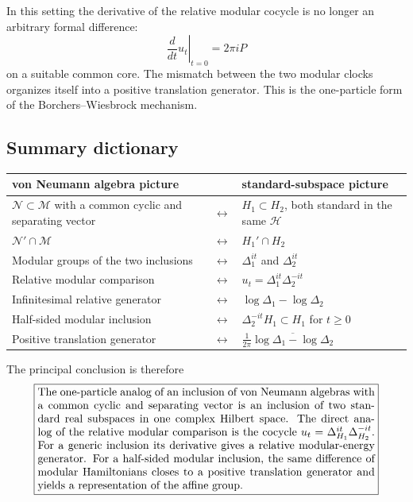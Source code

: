 \documentclass[a4paper,11pt]{article}
\theoremstyle{definition}
\newcommand{\cH}{\mathcal{H}}
\begin{document}
In this setting the derivative of the relative modular cocycle is no
longer an arbitrary formal difference:
\[
\left.\frac{d}{dt}u_t\right|_{t=0}
   =2\pi iP
\]
on a suitable common core.  The mismatch between the two modular clocks
organizes itself into a positive translation generator.  This is the
one-particle form of the Borchers--Wiesbrock mechanism.

\subsection*{Summary dictionary}

\renewcommand{\arraystretch}{1.45}
\setlength{\tabcolsep}{4pt}
\begin{center}
\begin{tabular}{>{\raggedright\arraybackslash}p{}
                >{\centering\arraybackslash}p{}
                >{\raggedright\arraybackslash}p{}}
\toprule
\textbf{von Neumann algebra picture}
& &
\textbf{standard-subspace picture}\\
\midrule
$\mathcal{N}\subset\mathcal{M}$ with a common cyclic and separating vector
& $\longleftrightarrow$ &
$H_1\subset H_2$, both standard in the same $\cH$\\
$\mathcal{N}'\cap\mathcal{M}$
& $\longleftrightarrow$ &
$H_1'\cap H_2$\\
Modular groups of the two inclusions
& $\longleftrightarrow$ &
$\Delta_1^{it}$ and $\Delta_2^{it}$\\
Relative modular comparison
& $\longleftrightarrow$ &
$u_t=\Delta_1^{it}\Delta_2^{-it}$\\
Infinitesimal relative generator
& $\longleftrightarrow$ &
$\log\Delta_1-\log\Delta_2$\\
Half-sided modular inclusion
& $\longleftrightarrow$ &
$\Delta_2^{-it}H_1\subset H_1$ for $t\geq0$\\
Positive translation generator
& $\longleftrightarrow$ &
$\frac{1}{2\pi}\overline{\log\Delta_1-\log\Delta_2}$\\
\bottomrule
\end{tabular}
\end{center}

The principal conclusion is therefore
\[
\boxed{
\begin{minipage}{0.88\textwidth}
The one-particle analog of an inclusion of von Neumann algebras with a
common cyclic and separating vector is an inclusion of two standard real
subspaces in one complex Hilbert space.  The direct analog of the relative
modular comparison is the cocycle
$u_t=\Delta_{H_1}^{it}\Delta_{H_2}^{-it}$.  For a generic inclusion its
derivative gives a relative modular-energy generator.  For a half-sided
modular inclusion, the same difference of modular Hamiltonians closes to
a positive translation generator and yields a representation of the
affine group.
\end{minipage}
}
\]
\end{document}

